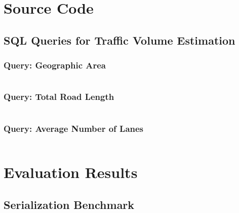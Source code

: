 \chapter{Source Code}
\label{appendix:source_code}

\section{SQL Queries for Traffic Volume Estimation}
\label{sec:appendix:source_code:traffic_volume}

\subsection{Query: Geographic Area}
\inputminted{sql}{97_listings/traffic_volume_1.sql}

\subsection{Query: Total Road Length}
\inputminted{sql}{97_listings/traffic_volume_2.sql}

\subsection{Query: Average Number of Lanes}
\inputminted{sql}{97_listings/traffic_volume_3.sql}

\chapter{Evaluation Results}
\section{Serialization Benchmark}
\label{sec:appendix:evaluation_results:serialization_benchmark}
\inputminted{text}{97_listings/serialization_evaluation.txt}